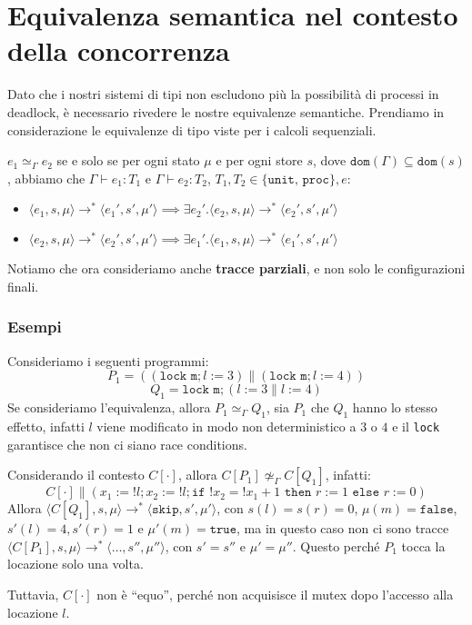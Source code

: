 \section{Equivalenza semantica nel contesto della concorrenza}
Dato che i nostri sistemi di tipi non escludono più la possibilità
di processi in deadlock, è necessario rivedere le nostre equivalenze semantiche.
Prendiamo
in considerazione le equivalenze di tipo viste per i calcoli sequenziali.
\begin{tcolorbox}[title = Equivalenza delle tracce $\simeq_\Gamma$]
    $e_1 \simeq_\Gamma e_2$ se e solo se per ogni stato $\mu$ e per ogni 
    store $s$, dove $\texttt{dom}(\Gamma) \subseteq \texttt{dom}(s)$,
    abbiamo che $\Gamma \vdash e_1 : T_1$ e $\Gamma \vdash e_2 : T_2$, 
    $T_1, T_2 \in \{ \texttt{unit, proc}\}, e$:
    \begin{itemize}
        \item $\langle e_1, s, \mu \rangle \rightarrow^* 
        \langle e_1', s', \mu' \rangle \implies 
        \exists e_2' . \langle e_2, s, \mu \rangle \rightarrow^*
        \langle e_2', s', \mu' \rangle$ 
        \item $\langle e_2, s, \mu \rangle \rightarrow^*
        \langle e_2', s', \mu' \rangle \implies
        \exists e_1' . \langle e_1, s, \mu \rangle \rightarrow^*
        \langle e_1', s', \mu' \rangle$
    \end{itemize}
\end{tcolorbox}
Notiamo che ora consideriamo anche \textbf{tracce parziali}, e non solo
le configurazioni finali.
\subsubsection{Esempi}
Consideriamo i seguenti programmi:
\[
    P_1 = ((\texttt{lock m}; l:=3) \parallel (\texttt{lock m}; l:=4))
\]
\[
    Q_1 = \texttt{lock m}; (l:=3 \parallel l:=4)
\]
Se consideriamo l'equivalenza, allora $P_1 \simeq_\Gamma Q_1$, 
sia $P_1$ che $Q_1$ hanno lo stesso effetto, infatti $l$ viene modificato 
in modo non deterministico a $3$ o $4$ e il \texttt{lock} garantisce che non ci 
siano race conditions.

Considerando il contesto $C[\cdot]$, allora $C[P_1] \not \simeq_\Gamma C[Q_1]$,
infatti:
\[
    C[\cdot] \parallel (x_1 := !l; x_2 := !l; \texttt{if }!x_2 = !x_1 + 1 \texttt{ then } 
    r:=1 \texttt{ else } r:=0)
\]
Allora $\langle C[Q_1], s, \mu \rangle \rightarrow^*
\langle \texttt{skip}, s', \mu' \rangle$, con 
$s(l) = s (r) = 0$, $\mu(m) = \texttt{false}$, $s'(l) = 4, s'(r) = 1$ e
$\mu'(m) = \texttt{true}$, ma in questo caso non ci sono tracce 
$\langle C[P_1], s, \mu \rangle \rightarrow^* \langle \dots, s'', \mu'' \rangle$,
con $s'=s''$ e $\mu' = \mu''$. Questo perché $P_1$ tocca la locazione solo una 
volta.

Tuttavia, $C[\cdot]$ non è ``equo'', perché non acquisisce il mutex dopo 
l'accesso alla locazione $l$.
